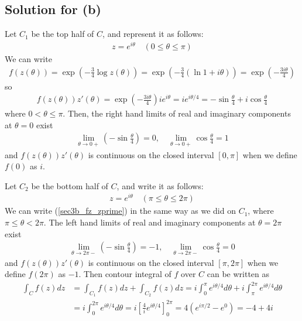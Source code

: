\documentclass{scrartcl}
\begin{document}
\subsection{Solution for (b)}
Let \(C_1\) be the top half of \(C\), and represent it as follows:
\begin{align*}
  z = e^{i\theta} \quad (0 \leq \theta \leq \pi)
\end{align*}
We can write
\begin{align*}
  f(z(\theta)) = \exp \left( -\frac{3}{4} \log z(\theta) \right) = \exp \left( -\frac{3}{4} (\ln 1 + i\theta) \right) = \exp \left( -\frac{3i\theta}{4} \right)
\end{align*}
so
\begin{align}\label{sec3b_fz_zprime}
  f(z(\theta)) z'(\theta) = \exp \left( -\frac{3i\theta}{4} \right) ie^{i\theta} = ie^{i\theta / 4} = -\sin \frac{\theta}{4} + i\cos \frac{\theta}{4}
\end{align}
where \(0 < \theta \leq \pi\).
Then, the right hand limits of real and imaginary components at \(\theta = 0\) exist
\begin{align*}
  \lim_{\theta \to 0+} \left( -\sin \frac{\theta}{4} \right) = 0, \quad \lim_{\theta \to 0+} \cos \frac{\theta}{4} = 1
\end{align*}
and \(f(z(\theta)) z'(\theta)\) is continuous on the closed interval \([0, \pi]\) when we define \(f(0)\) as \(i\).

Let \(C_2\) be the bottom half of \(C\), and write it as follows:
\begin{align*}
  z = e^{i\theta} \quad (\pi \leq \theta \leq 2\pi)
\end{align*}
We can write (\ref{sec3b_fz_zprime}) in the same way as we did on \(C_1\), where \(\pi \leq \theta < 2\pi\).
The left hand limits of real and imaginary components at \(\theta = 2\pi\) exist
\begin{align*}
  \lim_{\theta \to 2\pi-} \left( -\sin \frac{\theta}{4} \right) = -1, \quad \lim_{\theta \to 2\pi-} \cos \frac{\theta}{4} = 0
\end{align*}
and \(f(z(\theta)) z'(\theta)\) is continuous on the closed interval \([\pi, 2\pi]\) when we define \(f(2\pi)\) as \(-1\).
Then contour integral of \(f\) over \(C\) can be written as
\begin{align*}
  \int_C f(z) dz &= \int_{C_1} f(z) dz + \int_{C_2} f(z) dz = i \int^{\pi}_0 e^{i\theta / 4} d\theta + i \int^{2\pi}_\pi e^{i\theta / 4} d\theta \\
                 &= i \int^{2\pi}_0 e^{i\theta / 4} d\theta = i \left[ \frac{4}{i} e^{i\theta / 4} \right]^{2\pi}_0 = 4(e^{i\pi / 2} - e^0) = -4 + 4i
\end{align*}
\end{document}
